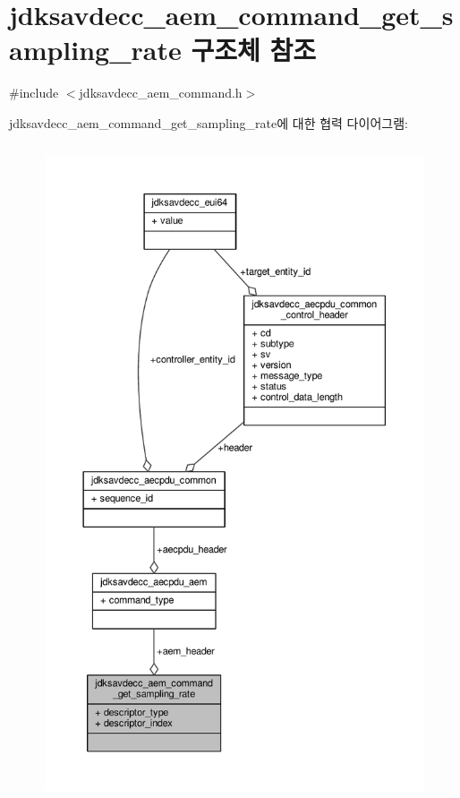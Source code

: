 \hypertarget{structjdksavdecc__aem__command__get__sampling__rate}{}\section{jdksavdecc\+\_\+aem\+\_\+command\+\_\+get\+\_\+sampling\+\_\+rate 구조체 참조}
\label{structjdksavdecc__aem__command__get__sampling__rate}


{\ttfamily \#include $<$jdksavdecc\+\_\+aem\+\_\+command.\+h$>$}



jdksavdecc\+\_\+aem\+\_\+command\+\_\+get\+\_\+sampling\+\_\+rate에 대한 협력 다이어그램\+:
\nopagebreak
\begin{figure}[H]
\begin{center}
\leavevmode
\includegraphics[height=550pt]{structjdksavdecc__aem__command__get__sampling__rate__coll__graph}
\end{center}
\end{figure}
